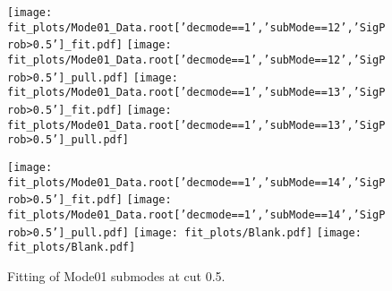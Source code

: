 \begin{figure}[p!]
\begin{center}
\texttt{[image: fit\_plots/Mode01\_Data.root['decmode==1','subMode==12','SigProb>0.5']\_fit.pdf]}
\texttt{[image: fit\_plots/Mode01\_Data.root['decmode==1','subMode==12','SigProb>0.5']\_pull.pdf]}
\texttt{[image: fit\_plots/Mode01\_Data.root['decmode==1','subMode==13','SigProb>0.5']\_fit.pdf]}
\texttt{[image: fit\_plots/Mode01\_Data.root['decmode==1','subMode==13','SigProb>0.5']\_pull.pdf]}

\texttt{[image: fit\_plots/Mode01\_Data.root['decmode==1','subMode==14','SigProb>0.5']\_fit.pdf]}
\texttt{[image: fit\_plots/Mode01\_Data.root['decmode==1','subMode==14','SigProb>0.5']\_pull.pdf]}
\texttt{[image: fit\_plots/Blank.pdf]}
\texttt{[image: fit\_plots/Blank.pdf]}

\caption{Fitting of Mode01 submodes at cut 0.5.}
\label{fig:fitMode01}
\end{center}
\end{figure}
